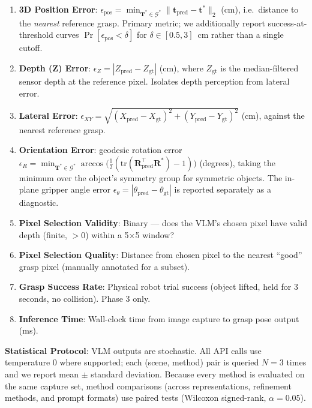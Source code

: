 \documentclass[11pt,a4paper]{article}
\begin{document}
\begin{enumerate}[label=\textbf{M\arabic*:}, leftmargin=*]
    \item \textbf{3D Position Error}: $\epsilon_{\text{pos}} = \min_{\mathbf{T}^* \in \mathcal{G}^*} \|\mathbf{t}_{\text{pred}} - \mathbf{t}^*\|_2$ (cm), i.e.\ distance to the \emph{nearest} reference grasp. Primary metric; we additionally report success-at-threshold curves $\Pr[\epsilon_{\text{pos}} < \delta]$ for $\delta \in [0.5, 3]$~cm rather than a single cutoff.
    \item \textbf{Depth (Z) Error}: $\epsilon_Z = |Z_{\text{pred}} - Z_{\text{gt}}|$ (cm), where $Z_{\text{gt}}$ is the median-filtered sensor depth at the reference pixel. Isolates depth perception from lateral error.
    \item \textbf{Lateral Error}: $\epsilon_{XY} = \sqrt{(X_{\text{pred}} - X_{\text{gt}})^2 + (Y_{\text{pred}} - Y_{\text{gt}})^2}$ (cm), against the nearest reference grasp.
    \item \textbf{Orientation Error}: geodesic rotation error $\epsilon_R = \min_{\mathbf{T}^* \in \mathcal{G}^*} \arccos\big(\tfrac{1}{2}(\mathrm{tr}(\mathbf{R}_{\text{pred}}^\top \mathbf{R}^*) - 1)\big)$ (degrees), taking the minimum over the object's symmetry group for symmetric objects. The in-plane gripper angle error $\epsilon_{\theta} = |\theta_{\text{pred}} - \theta_{\text{gt}}|$ is reported separately as a diagnostic.
    \item \textbf{Pixel Selection Validity}: Binary --- does the VLM's chosen pixel have valid depth (finite, $>$0) within a 5$\times$5 window?
    \item \textbf{Pixel Selection Quality}: Distance from chosen pixel to the nearest ``good'' grasp pixel (manually annotated for a subset).
    \item \textbf{Grasp Success Rate}: Physical robot trial success (object lifted, held for 3 seconds, no collision). Phase 3 only.
    \item \textbf{Inference Time}: Wall-clock time from image capture to grasp pose output (ms).
\end{enumerate}

\textbf{Statistical Protocol}: VLM outputs are stochastic. All API calls use temperature 0 where supported; each (scene, method) pair is queried $N=3$ times and we report mean $\pm$ standard deviation. Because every method is evaluated on the same capture set, method comparisons (across representations, refinement methods, and prompt formats) use paired tests (Wilcoxon signed-rank, $\alpha = 0.05$).
\end{document}

